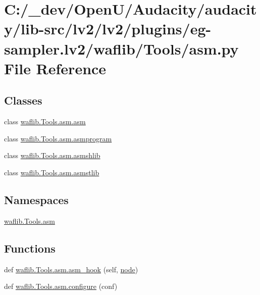 \hypertarget{lv2_2plugins_2eg-sampler_8lv2_2waflib_2_tools_2asm_8py}{}\section{C\+:/\+\_\+dev/\+Open\+U/\+Audacity/audacity/lib-\/src/lv2/lv2/plugins/eg-\/sampler.lv2/waflib/\+Tools/asm.py File Reference}
\label{lv2_2plugins_2eg-sampler_8lv2_2waflib_2_tools_2asm_8py}
\subsection*{Classes}
\begin{DoxyCompactItemize}
\item 
class \hyperlink{classwaflib_1_1_tools_1_1asm_1_1asm}{waflib.\+Tools.\+asm.\+asm}
\item 
class \hyperlink{classwaflib_1_1_tools_1_1asm_1_1asmprogram}{waflib.\+Tools.\+asm.\+asmprogram}
\item 
class \hyperlink{classwaflib_1_1_tools_1_1asm_1_1asmshlib}{waflib.\+Tools.\+asm.\+asmshlib}
\item 
class \hyperlink{classwaflib_1_1_tools_1_1asm_1_1asmstlib}{waflib.\+Tools.\+asm.\+asmstlib}
\end{DoxyCompactItemize}
\subsection*{Namespaces}
\begin{DoxyCompactItemize}
\item 
 \hyperlink{namespacewaflib_1_1_tools_1_1asm}{waflib.\+Tools.\+asm}
\end{DoxyCompactItemize}
\subsection*{Functions}
\begin{DoxyCompactItemize}
\item 
def \hyperlink{namespacewaflib_1_1_tools_1_1asm_a287387dfaa8ffc9c35127be5128a185a}{waflib.\+Tools.\+asm.\+asm\+\_\+hook} (self, \hyperlink{structnode}{node})
\item 
def \hyperlink{namespacewaflib_1_1_tools_1_1asm_a223dd8eb9aca9f00c6758ed10833701a}{waflib.\+Tools.\+asm.\+configure} (conf)
\end{DoxyCompactItemize}
